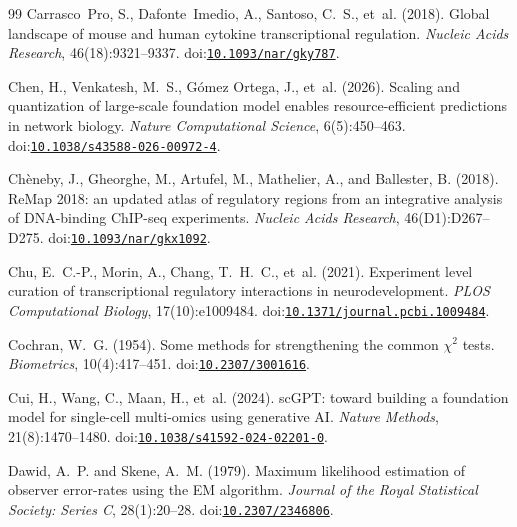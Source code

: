 \begin{thebibliography}{99}
Carrasco Pro, S., Dafonte Imedio, A., Santoso, C.~S., et~al. (2018).
\newblock Global landscape of mouse and human cytokine transcriptional regulation.
\newblock \emph{Nucleic Acids Research}, 46(18):9321--9337.
\newblock doi:\href{https://doi.org/10.1093/nar/gky787}{\nolinkurl{10.1093/nar/gky787}}.

Chen, H., Venkatesh, M.~S., G{\'o}mez Ortega, J., et~al. (2026).
\newblock Scaling and quantization of large-scale foundation model enables resource-efficient predictions in network biology.
\newblock \emph{Nature Computational Science}, 6(5):450--463.
\newblock doi:\href{https://doi.org/10.1038/s43588-026-00972-4}{\nolinkurl{10.1038/s43588-026-00972-4}}.

Ch{\`e}neby, J., Gheorghe, M., Artufel, M., Mathelier, A., and Ballester, B. (2018).
\newblock ReMap 2018: an updated atlas of regulatory regions from an integrative analysis of DNA-binding ChIP-seq experiments.
\newblock \emph{Nucleic Acids Research}, 46(D1):D267--D275.
\newblock doi:\href{https://doi.org/10.1093/nar/gkx1092}{\nolinkurl{10.1093/nar/gkx1092}}.

Chu, E.~C.-P., Morin, A., Chang, T.~H.~C., et~al. (2021).
\newblock Experiment level curation of transcriptional regulatory interactions in neurodevelopment.
\newblock \emph{PLOS Computational Biology}, 17(10):e1009484.
\newblock doi:\href{https://doi.org/10.1371/journal.pcbi.1009484}{\nolinkurl{10.1371/journal.pcbi.1009484}}.

Cochran, W.~G. (1954).
\newblock Some methods for strengthening the common $\chi^2$ tests.
\newblock \emph{Biometrics}, 10(4):417--451.
\newblock doi:\href{https://doi.org/10.2307/3001616}{\nolinkurl{10.2307/3001616}}.

Cui, H., Wang, C., Maan, H., et~al. (2024).
\newblock sc{GPT}: toward building a foundation model for single-cell multi-omics using generative {AI}.
\newblock \emph{Nature Methods}, 21(8):1470--1480.
\newblock doi:\href{https://doi.org/10.1038/s41592-024-02201-0}{\nolinkurl{10.1038/s41592-024-02201-0}}.

Dawid, A.~P. and Skene, A.~M. (1979).
\newblock Maximum likelihood estimation of observer error-rates using the {EM} algorithm.
\newblock \emph{Journal of the Royal Statistical Society: Series C}, 28(1):20--28.
\newblock doi:\href{https://doi.org/10.2307/2346806}{\nolinkurl{10.2307/2346806}}.


\end{thebibliography}
